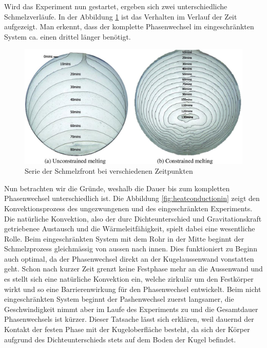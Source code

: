 \documentclass[11pt,a4paper]{scrartcl}
\begin{document}
Wird das Experiment nun gestartet, ergeben sich zwei unterschiedliche
Schmelzverläufe. In der Abbildung \ref{fig:meltingphasefront} ist das Verhalten
im Verlauf der Zeit aufgezeigt. Man erkennt, dass der komplette Phasenwechsel im
eingeschränkten System ca. einen drittel länger benötigt.
\begin{figure}[h!]
\begin{center}
\includegraphics[scale=0.35]{images/meltingphasefront.jpg}
\caption{Serie der Schmelzfront bei verschiedenen Zeitpunkten
\cite{meltingpaper}}
\label{fig:meltingphasefront}
\end{center}
\end{figure}

Nun betrachten wir die Gründe, weshalb die Dauer bis zum kompletten
Phasenwechsel unterschiedlich ist. Die Abbildung \ref{fig:heatconductionin}
zeigt den Konvektionsprozess des ungezwungenen und des eingeschränkten
Experiments. Die natürliche Konvektion, also der durc Dichteunterschied und
Gravitationskraft getriebenee Austausch und die Wärmeleitfähigkeit, spielt dabei
eine wesentliche Rolle. Beim eingeschränkten System mit dem Rohr in der Mitte
beginnt der Schmelzprozess gleichmässig von aussen nach innen. Dies funktioniert
zu Beginn auch optimal, da der Phasenwechsel direkt an der Kugelaussenwand
vonstatten geht. Schon nach kurzer Zeit grenzt keine Festphase mehr an die
Aussenwand und es stellt sich eine natürliche Konvektion ein, welche zirkulär um
den Festkörper wirkt und so eine Barrierenwirkung für den Phasenwechsel
entwickelt. Beim nicht eingeschränkten System beginnt der Pashenwechsel zuerst
langsamer, die Geschwindigkeit nimmt aber im Laufe des Experiments zu und die
Gesamtdauer Phasenwechsels ist kürzer. Dieser Tatsache lässt sich erklären, weil
dauernd der Kontakt der festen Phase mit der Kugeloberfläche besteht, da sich
der Körper aufgrund des Dichteunterschieds stets auf dem Boden der Kugel
befindet.
\end{document}

